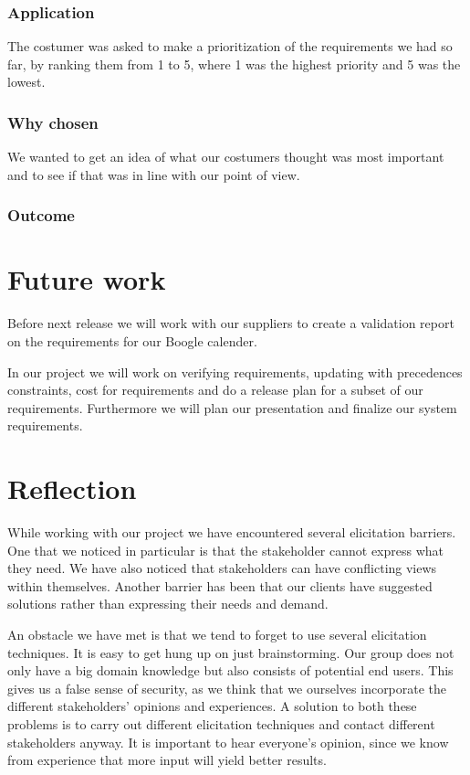 \documentclass[a4paper]{article}
\begin{document}
		\subsubsection{Application}
			The costumer was asked to make a prioritization of the requirements we had so far, by ranking them from 1 to 5, where 1 was the highest priority and 5 was the lowest.
		\subsubsection{Why chosen}
			We wanted to get an idea of what our costumers thought was most important and to see if that was in line with our point of view.
		\subsubsection{Outcome}

	

	\section{Future work}
	Before next release we will work with our suppliers to create a validation report on the requirements for our Boogle calender.
	
	In our project we will work on verifying requirements, updating with precedences constraints, cost for requirements and do a release plan for a subset of our requirements. Furthermore we will plan our presentation and finalize our system requirements.
 
	\section{Reflection}

While working with our project we have encountered several elicitation barriers. One that we noticed in particular is that the stakeholder cannot express what they need. We have also noticed that stakeholders can have conflicting views within themselves. Another barrier has been that our clients have suggested solutions rather than expressing their needs and demand.

An obstacle we have met is that we tend to forget to use several elicitation techniques. It is easy to get hung up on just brainstorming. Our group does not only have a big domain knowledge but also consists of potential end users. This gives us a false sense of security, as we think that we ourselves incorporate the different stakeholders' opinions and experiences. A solution to both these problems is to carry out different elicitation techniques and contact different stakeholders anyway. It is important to hear everyone's opinion, since we know from experience that more input will yield better results.
\end{document}
